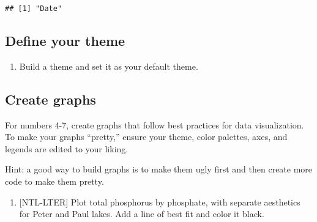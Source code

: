 \documentclass[]{article}
\newenvironment{Shaded}{\begin{snugshade}}{\end{snugshade}}
\newcommand{\KeywordTok}[1]{\textcolor[rgb]{0.13,0.29,0.53}{\textbf{#1}}}
\newcommand{\DataTypeTok}[1]{\textcolor[rgb]{0.13,0.29,0.53}{#1}}
\newcommand{\DecValTok}[1]{\textcolor[rgb]{0.00,0.00,0.81}{#1}}
\newcommand{\StringTok}[1]{\textcolor[rgb]{0.31,0.60,0.02}{#1}}
\newcommand{\CommentTok}[1]{\textcolor[rgb]{0.56,0.35,0.01}{\textit{#1}}}
\newcommand{\OperatorTok}[1]{\textcolor[rgb]{0.81,0.36,0.00}{\textbf{#1}}}
\newcommand{\NormalTok}[1]{#1}
\providecommand{\tightlist}{%
  \setlength{\itemsep}{0pt}\setlength{\parskip}{0pt}}
\begin{document}
\begin{verbatim}
## [1] "Date"
\end{verbatim}

\subsection{Define your theme}\label{define-your-theme}

\begin{enumerate}
\def\labelenumi{\arabic{enumi}.}
\setcounter{enumi}{2}
\tightlist
\item
  Build a theme and set it as your default theme.
\end{enumerate}

\begin{Shaded}
\end{Shaded}

\subsection{Create graphs}\label{create-graphs}

For numbers 4-7, create graphs that follow best practices for data
visualization. To make your graphs ``pretty,'' ensure your theme, color
palettes, axes, and legends are edited to your liking.

Hint: a good way to build graphs is to make them ugly first and then
create more code to make them pretty.

\begin{enumerate}
\def\labelenumi{\arabic{enumi}.}
\setcounter{enumi}{3}
\tightlist
\item
  {[}NTL-LTER{]} Plot total phosphorus by phosphate, with separate
  aesthetics for Peter and Paul lakes. Add a line of best fit and color
  it black.
\end{enumerate}
\end{document}
